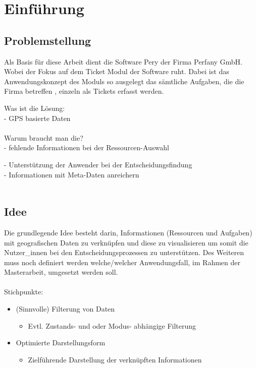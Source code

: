 \documentclass[Bachelorarbeit.tex]{subfiles}
\begin{document}
\chapter{Einführung}
\label{chap:einfuehrung}

\section{Problemstellung}
\label{chap:einfuehrung:sec:problemstellung}

Als Basis für diese Arbeit dient die Software Pery der Firma Perfany GmbH. Wobei der Fokus auf dem Ticket Modul der Software ruht. Dabei ist das Anwendungskonzept des Moduls so ausgelegt das sämtliche Aufgaben, die die Firma betreffen , einzeln als Tickets erfasst werden. 


Was ist die Lösung:\\
- GPS basierte Daten\\
\\
Warum braucht man die?\\
- fehlende Informationen bei der Ressourcen-Auswahl

- Unterstützung der Anwender bei der Entscheidungsfindung \\
- Informationen mit Meta-Daten anreichern\\
\\


\section{Idee}
\label{chap:einfuehrung:sec:idee}

Die grundlegende Idee besteht darin, Informationen (Ressourcen und Aufgaben) mit geografischen Daten zu verknüpfen und diese zu visualisieren um somit die Nutzer\_innen bei den Entscheidungsprozessen zu unterstützen. Des Weiteren muss noch definiert werden welche/welcher Anwendungsfall, im Rahmen der Masterarbeit, umgesetzt werden soll.\\
\\
Stichpunkte:
\begin{itemize}
\item (Sinnvolle) Filterung von Daten
\begin{itemize}
	\item Evtl. Zustands- und oder Modus- abhängige Filterung
\end{itemize}
\item Optimierte Darstellungsform
\begin{itemize}
	\item Zielführende Darstellung der verknüpften Informationen
\end{itemize}
\end{itemize}
\end{document}

